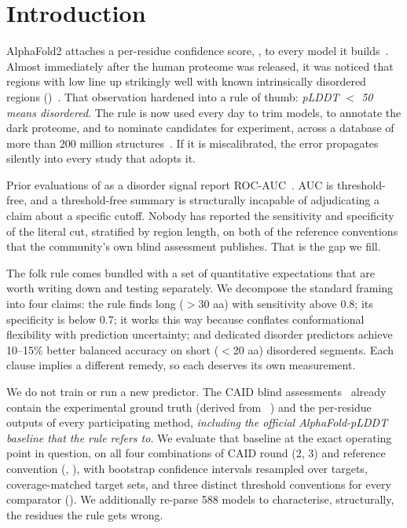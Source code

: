 \section{Introduction}
\label{sec:intro}

AlphaFold2 attaches a per-residue confidence score, \plddt, to every model it
builds~\citep{jumper2021}. Almost immediately after the human proteome was released, it was
noticed that regions with low \plddt line up strikingly well with known intrinsically
disordered regions (\idrs)~\citep{tunyasuvunakool2021}. That observation hardened into a rule
of thumb: \emph{pLDDT $<$ 50 means disordered}. The rule is now used every day to trim models,
to annotate the dark proteome, and to nominate \idr candidates for experiment, across a database
of more than 200 million structures~\citep{varadi2022}. If it is miscalibrated, the error
propagates silently into every study that adopts it.

 Prior evaluations of \plddt as a
disorder signal report ROC-AUC~\citep{piovesan2022,kurgan2023}. AUC is threshold-free, and a
threshold-free summary is structurally incapable of adjudicating a claim about a specific
cutoff. Nobody has reported the sensitivity and specificity of the literal \plddtrule cut,
stratified by region length, on both of the reference conventions that the community's own
blind assessment publishes. That is the gap we fill.

 The folk rule comes bundled with a set of quantitative
expectations that are worth writing down and testing separately. We decompose the standard
framing into four claims: \cone the rule finds long ($>$30 aa) \idrs with sensitivity above
0.8; \ctwo its specificity is below 0.7; \cthree it works this way because \plddt conflates
conformational flexibility with prediction uncertainty; and \cfour dedicated disorder
predictors achieve 10--15\% better balanced accuracy on short ($<$20 aa) disordered segments.
Each clause implies a different remedy, so each deserves its own measurement.

 We do not train or run a new predictor. The CAID blind
assessments~\citep{delconte2023,mehdiabadi2026} already contain the experimental ground truth
(derived from \disprot~\citep{quaglia2022}) and the per-residue outputs of every participating
method, \emph{including the official AlphaFold-pLDDT baseline that the rule refers to}. We evaluate
that baseline at the exact operating point in question, on all four combinations of CAID round
(2, 3) and reference convention (\dpdb, \dnox), with bootstrap confidence intervals resampled
over targets, coverage-matched target sets, and three distinct threshold conventions for every
comparator (). We additionally re-parse 588 \afdb models to characterise,
structurally, the residues the rule gets wrong.

